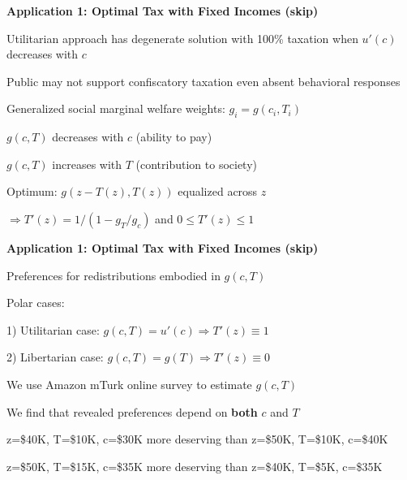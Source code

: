 \documentclass[landscape]{slides}
\begin{document}
\begin{slide}
\begin{center}
{\bf Application 1: Optimal Tax with Fixed Incomes (skip)}
\end{center}

Utilitarian approach has degenerate solution with 100\% taxation when $u'(c)$ decreases with $c$

Public may not support confiscatory taxation even absent behavioral responses

Generalized social marginal welfare weights: $g_i=g(c_i,T_i)$

$g(c,T) $ decreases with $c$ (ability to pay)

$g(c,T)$ increases with $T$ (contribution to society)

Optimum: $g(z-T(z),T(z))$ equalized across $z$ 

$\Rightarrow T'(z)=1/(1-g_T/g_c)$ and $0 \leq T'(z) \leq 1$

\end{slide}


\begin{slide}
\begin{center}
{\bf Application 1: Optimal Tax with Fixed Incomes (skip)}
\end{center}
Preferences for redistributions embodied in $g(c,T)$

Polar cases:

1) Utilitarian case: $g(c,T)=u'(c)  \Rightarrow T'(z)\equiv 1$

2) Libertarian case: $g(c,T)=g(T)  \Rightarrow T'(z) \equiv 0$

We use Amazon mTurk online survey to estimate $g(c,T)$

We find that revealed preferences depend on \textbf{both} $c$ and $T$

\small
z=\$40K, T=\$10K, c=\$30K more deserving than z=\$50K, T=\$10K, c=\$40K

z=\$50K, T=\$15K, c=\$35K more deserving than z=\$40K, T=\$5K, c=\$35K

\end{slide}

%
%
%
%
%
\end{document}
